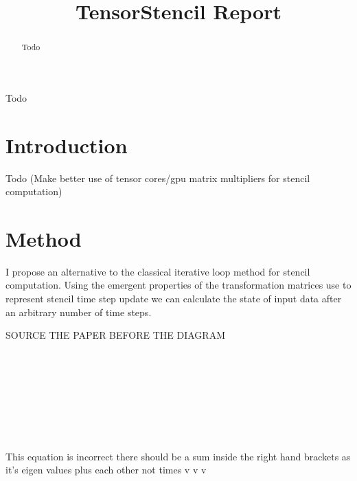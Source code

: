 \documentclass[conference]{IEEEtran}
\begin{document}

\title{TensorStencil Report}

\author{

}

\maketitle

\begin{abstract}
Todo
\end{abstract}

\begin{IEEEkeywords}
Todo
\end{IEEEkeywords}


\section{Introduction}
Todo (Make better use of tensor cores/gpu matrix multipliers for stencil computation)
\section{Method}
I propose an alternative to the classical iterative loop method for stencil computation. 
Using the emergent properties of the transformation matrices use to represent stencil time step update we can calculate the state of input data after an arbitrary number of time steps. 

SOURCE THE PAPER BEFORE THE DIAGRAM \\

 \\
 \\
 \\
 \\
 \\







 \\ \\ \\ 
This equation is incorrect there should be a sum inside the right hand brackets as it's eigen values plus each other not times v v v\\
 


\end{document}
